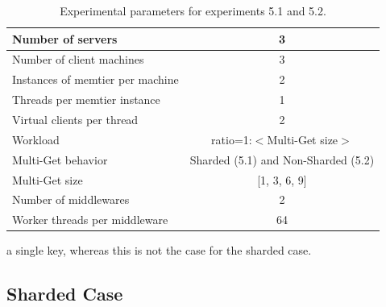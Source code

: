     \begin{table}
        \scriptsize{
            \begin{tabular}{|l|c|}
                \hline Number of servers                & 3 \\
                \hline Number of client machines        & 3 \\
                \hline Instances of memtier per machine & 2 \\
                \hline Threads per memtier instance     & 1 \\
                \hline Virtual clients per thread       & 2 \\
                \hline Workload                         & ratio=1:$<$Multi-Get size$>$ \\
                \hline Multi-Get behavior               & Sharded (5.1) and Non-Sharded (5.2) \\
                \hline Multi-Get size                   & [1, 3, 6, 9] \\
                \hline Number of middlewares            & 2 \\
                \hline Worker threads per middleware    & 64 \\
                \hline
            \end{tabular}
        }
            \caption{Experimental parameters for experiments 5.1 and 5.2.\label{tab:50_setup}}
    \end{table}a single key, whereas this is not the case for the sharded case.

    \subsection{Sharded Case\label{subsec:5_sharded}}

